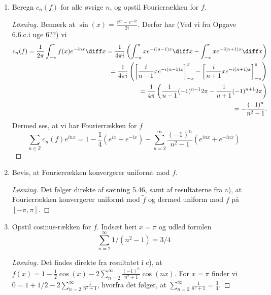 \begin{opg}
\begin{enumerate}
\begin{proof}[Løsning]
\begin{equation*}
			\end{equation*}
			hvor vi har brugt partiel integration, og 
			$$
			c_0(f)=\frac{1}{2\pi}\int_{-\pi}^{\pi}x\sin(x)\diff x=\frac{1}{2\pi}\left[x(-\cos(x))\right]_{-\pi}^{\pi}+\frac{1}{2\pi}\int_{-\pi}^{\pi}\cos(x)\diff x=1,
			$$
			hvor vi igen har brugt partiel integration.
		\end{proof}
		\fi
		\item Beregn $ c_n(f) $ for alle øvrige $ n $, og opstil Fourierrækken for $ f $. 
		\ifanswers
		\begin{proof}[Løsning]
			Bemærk at $ \sin(x)=\frac{e^{ix}-e^{-ix}}{2i} $. Derfor har (Ved vi fra Opgave 6.6.c.i uge 6??) vi\begin{equation*}
			\begin{aligned}
			c_n(f)=\frac{1}{2\pi}\int_{-\pi}^{\pi}f(x)e^{-inx}\diff x=\frac{1}{4\pi i} \left(\int_{-\pi}^{\pi}xe^{-i(n-1)x}\diff x-\int_{-\pi}^{\pi}xe^{-i(n+1)x}\diff x\right)\\
			=\frac{1}{4\pi i} \left(\left[\frac{i}{n-1}xe^{-i(n-1)x}\right]_{-\pi}^{\pi}-\left[\frac{i}{n+1}xe^{-i(n+1)x}\right]_{-\pi}^{\pi}\right)\\
			=\frac{1}{4\pi}\left(\frac{1}{n-1}(-1)^{n-1}2\pi-\frac{1}{n+1}(-1)^{n+1}2\pi\right)\\
			=-\frac{(-1)^n}{n^2-1}.
			\end{aligned}
			\end{equation*}
			Dermed ses, at vi har Fourierrækken for $ f $
			$$
			\sum_{n\in \mathbb{Z}}c_n(f)e^{inx}=1-\frac{1}{4}(e^{ix}+e^{-ix})-\sum_{n=2}^{\infty}\frac{(-1)^n}{n^2-1}\left(e^{inx}+e^{-inx}\right)
			$$
		\end{proof}
		\fi
		\item Bevis, at Fourierrækken konvergerer uniformt mod $ f $.
		\ifanswers
		\begin{proof}[Løsning]
			Det følger direkte af sætning 5.46, samt af resultaterne fra a), at Fourierrækken konvergerer uniformt mod $ \tilde{f} $ og dermed uniform mod $ f $ på $ [-\pi,\pi] $.
		\end{proof}
		\fi
		\item Opstil cosinus-rækken for $ f $. Indsæt heri $ x=\pi $ og udled formlen
		$$
		\sum_{n=2}^\infty 1/(n^2-1)=3/4
		$$
		\ifanswers
		\begin{proof}[Løsning]
			Det findes direkte fra resultatet i c), at $ f(x)=1-\frac{1}{2}\cos(x)-2\sum_{n=2}^{\infty}\frac{(-1)^n}{n^2+1}\cos(nx) $. For $ x=\pi $ finder vi $ 0=1+1/2-2\sum_{n=2}^{\infty}\frac{1}{n^2+1} $, hvorfra det følger, at $ \sum_{n=2}^{\infty}\frac{1}{n^2+1}=\frac{3}{4} $.
		\end{proof}
		\fi
	\end{enumerate}
\end{opg}